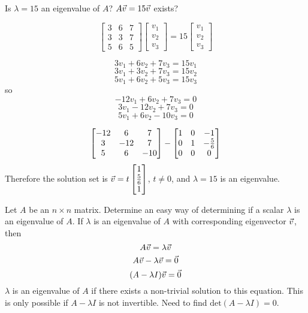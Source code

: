 \documentclass[english, 12pt]{article}
\begin{document}
\begin{exmp}
Is $\lambda = 15$ an eigenvalue of $A$? $A\vec{v} = 15\vec{v}$ exists?

\begin{sol}
\[\begin{bmatrix} 3 & 6 & 7 \\ 3 & 3 & 7 \\ 5 & 6 & 5 \end{bmatrix} \begin{bmatrix} v_{1} \\ v_{2} \\ v_{3} \end{bmatrix} = 15 \begin{bmatrix} v_{1} \\ v_{2} \\ v_{3} \end{bmatrix}\]

\[3v_{1} + 6 v_{2} + 7 v_{3} = 15v_{1}\]
\[3v_{1} + 3v_{2} + 7 v_{3} = 15v_{2}\]
\[5v_{1} + 6v_{2} + 5 v_{3} = 15v_{3}\]
so
\[-12v_{1} + 6 v_{2} + 7 v_{3} = 0\]
\[3v_{1}  -12v_{2} + 7 v_{3} = 0\]
\[5v_{1} + 6v_{2} - 10 v_{3} = 0\]

\[\begin{bmatrix} -12 & 6 & 7 \\ 3 & -12 & 7 \\ 5 & 6 & -10 \end{bmatrix} - \begin{bmatrix} 1 & 0 & -1 \\ 0 & 1 & -\frac{5}{6} \\ 0 & 0 & 0 \end{bmatrix}\]
Therefore the solution set is $\vec{v} = t \begin{bmatrix} 1 \\ \frac{5}{6} \\ 1 \end{bmatrix}$, $t \neq 0$, and $\lambda = 15$ is an eigenvalue.
\end{sol}
\end{exmp}

Let $A$ be an $n \times n$ matrix. Determine an easy way of determining if a scalar $\lambda$ is an eigenvalue of $A$. If $\lambda$ is an eigenvalue of $A$ with corresponding eigenvector $\vec{v}$, then
\[A\vec{v} = \lambda \vec{v}\]
\[A\vec{v} - \lambda \vec{v} = \vec{0}\]
\[(A - \lambda I) \vec{v} = \vec{0}\]
$\lambda$ is an eigenvalue of $A$ if there exists a non-trivial solution to this equation. This is only possible if $A - \lambda I$ is not invertible. Need to find $\text{det}(A - \lambda I) = 0$.
\end{document}
